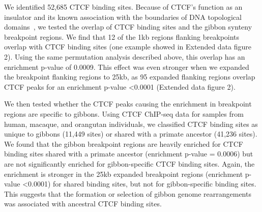 We identified 52,685 CTCF binding sites. Because of CTCF's function as an insulator and its known association with the boundaries of DNA topological domains~\cite{Dixon:2012gc}, we tested the overlap of CTCF binding sites and the gibbon synteny breakpoint regions. We find that 12 of the 1kb regions flanking breakpoints overlap with CTCF binding sites (one example showed in Extended data figure 2). Using the same permutation analysis described above, this overlap has an enrichment p-value of 0.0009. This effect was even stronger when we expanded the breakpoint flanking regions to 25kb,  as 95 expanded flanking regions overlap CTCF peaks for an enrichment p-value <0.0001 (Extended data figure 2).

We then tested whether the CTCF peaks causing the enrichment in breakpoint regions are specific to gibbons. Using CTCF ChIP-seq data for samples from human, macaque, and orangutan individuals, we classified CTCF binding sites as unique to gibbons (11,449 sites) or shared with a primate ancestor (41,236 sites). We found that the gibbon breakpoint regions are heavily enriched for CTCF binding sites shared with a primate ancestor (enrichment p-value = 0.0006) but are not significantly enriched for gibbon-specific CTCF binding sites. Again, the enrichment is stronger in the 25kb expanded breakpoint regions (enrichment p-value <0.0001) for shared binding sites, but not for gibbon-specific binding sites. This suggests that the formation or selection of gibbon genome rearrangements was associated with ancestral CTCF binding sites.